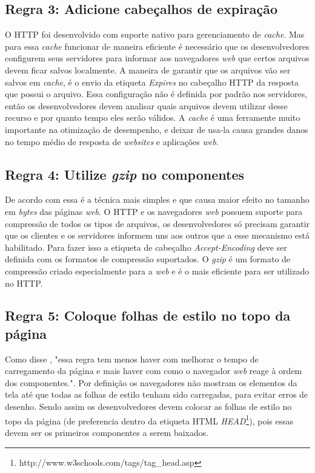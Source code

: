 \subsection{Regra 3: Adicione cabeçalhos de expiração}
\label{subsec:highperformance_regra3}
O HTTP foi desenvolvido com suporte nativo para gerenciamento de \textit{cache}. Mas para essa \textit{cache} funcionar de maneira eficiente é necessário que os desenvolvedores configurem seus servidores para informar aos navegadores \textit{web} que certos arquivos devem ficar salvos localmente. A maneira de garantir que os arquivos vão ser salvos em \textit{cache}, é o envio da etiqueta \textit{Expires} no cabeçalho HTTP da resposta que possui o arquivo. Essa configuração não é definida por padrão nos servidores, então os desenvolvedores devem analisar quais arquivos devem utilizar desse recurso e por quanto tempo eles serão válidos. A \textit{cache} é uma ferramente muito importante na otimização de desempenho, e deixar de usa-la causa grandes danos no tempo médio de resposta de \textit{websites} e aplicações \textit{web}.

\subsection{Regra 4: Utilize \textit{gzip} no componentes}
\label{subsec:highperformance_regra4}
De acordo com  essa é a técnica mais simples e que causa maior efeito no tamanho em \textit{bytes} das páginas \textit{web}. O HTTP e os navegadores \textit{web} possuem suporte para compressão de todos os tipos de arquivos, os desenvolvedores só precisam garantir que os clientes e os servidores informem uns aos outros que a esse mecanismo está habilitado. Para fazer isso a etiqueta de cabeçalho \textit{Accept-Encoding} deve ser definida com os formatos de compressão suportados. O \textit{gzip} é um formato de compressão criado especialmente para a \textit{web} e é o mais eficiente para ser utilizado no HTTP.

\subsection{Regra 5: Coloque folhas de estilo no topo da página}
\label{subsec:highperformance_regra5}
Como disse , "essa regra tem menos haver com melhorar o tempo de carregamento da página e mais haver com como o navegador \textit{web} reage à ordem dos componentes.". Por definição os navegadores não mostram os elementos da tela até que todas as folhas de estilo tenham sido carregadas, para evitar erros de desenho. Sendo assim os desenvolvedores devem colocar as folhas de estilo no topo da página (de preferencia dentro da etiqueta HTML \textit{HEAD}\footnote{http://www.w3schools.com/tags/tag\_head.asp}), pois essas devem ser os primeiros componentes a serem baixados.

